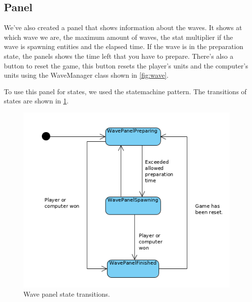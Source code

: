 \subsection{Panel}
\label{sec:wave-panel}

We've also created a panel that shows information about the waves. It shows 
at which wave we are, the maximum amount of waves, the stat multiplier if 
the wave is spawning entities and the elapsed time. If the wave is in the 
preparation state, the panels shows the time left that you have to prepare.
There's also a button to reset the game, this button resets the player's 
units and the computer's units using the WaveManager class shown in 
\cref{fig:wave}.

To use this panel for states, we used the statemachine pattern. The 
transitions of states are shown in \cref{fig:wavepanel-states}.

\begin{figure}[H]
    \centering
    \includegraphics[scale=0.75]{res/wave-panel-states.png}
    \caption{Wave panel state transitions.}\label{fig:wavepanel-states}
\end{figure}
